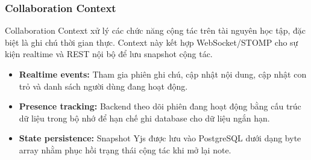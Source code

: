 \subsubsection{Collaboration Context}
\label{subsubsec:collaboration-context}

Collaboration Context xử lý các chức năng cộng tác trên tài nguyên học tập, đặc biệt là ghi chú thời gian thực. Context này kết hợp WebSocket/STOMP cho sự kiện realtime và REST nội bộ để lưu snapshot cộng tác.

\begin{itemize}
    \item \textbf{Realtime events:} Tham gia phiên ghi chú, cập nhật nội dung, cập nhật con trỏ và danh sách người dùng đang hoạt động.
    \item \textbf{Presence tracking:} Backend theo dõi phiên đang hoạt động bằng cấu trúc dữ liệu trong bộ nhớ để hạn chế ghi database cho dữ liệu ngắn hạn.
    \item \textbf{State persistence:} Snapshot Yjs được lưu vào PostgreSQL dưới dạng byte array nhằm phục hồi trạng thái cộng tác khi mở lại note.
\end{itemize}